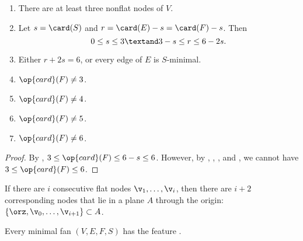\begin{lemma}
\begin{enumerate}
\item {} There are at least three nonflat nodes of $V$.
\item {} %
Let      $s=\card(S)$ and $r=\card(E) - s = \card(F)-s$.  Then
\[ 0\le s \le 3\textand 3-s \le r \le 6 -
2s.\] 
\item {} Either $r+2s = 6$, or every edge of $E$ is $S$-minimal.
\item {} $\op{card}(F) \ne 3$.
\item {} $\op{card}(F) \ne 4$.
\item {} $\op{card}(F) \ne 5$.
\item {} $\op{card}(F) \ne 6$.
\end{enumerate}\wasitemize 
\end{lemma}

\begin{proof}
  By , $3\le\op{card}(F)\le 6-s\le 6$.  However, by
  , ,
  , and , we cannot have
  $3\le\op{card}(F)\le 6$.
\end{proof}





If there are $i$ consecutive flat nodes $\v_1,\ldots,\v_i$, then there
are $i+2$ corresponding nodes that lie in a plane $A$ through the
origin: $\{\orz,\v_0,\ldots,\v_{i+1}\}\subset A$.

\begin{lemma}[]
Every minimal fan $(V,E,F,S)$ has the feature .
\end{lemma}

